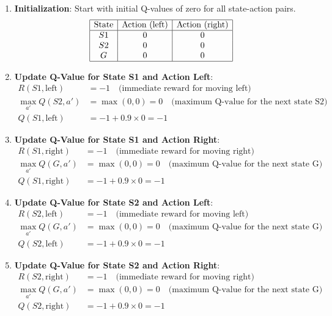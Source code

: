 \documentclass{article}
\begin{document}
\begin{enumerate}
    \item \textbf{Initialization}: Start with initial Q-values of zero for all state-action pairs.
   \[
   \begin{array}{|c|c|c|}
   \hline
   \text{State} & \text{Action (left)} & \text{Action (right)} \\
   \hline
   S1 & 0 & 0 \\
   S2 & 0 & 0 \\
   G & 0 & 0 \\
   \hline
   \end{array}
   \]

    \item \textbf{Update Q-Value for State S1 and Action Left}:
   \begin{align*}
   R(S1, \text{left}) &= -1 \quad \text{(immediate reward for moving left)} \\
   \max_{a'} Q(S2, a') &= \max(0, 0) = 0 \quad \text{(maximum Q-value for the next state S2)} \\
   Q(S1, \text{left}) &= -1 + 0.9 \times 0 = -1
   \end{align*}

    \item \textbf{Update Q-Value for State S1 and Action Right}:
   \begin{align*}
   R(S1, \text{right}) &= -1 \quad \text{(immediate reward for moving right)} \\
   \max_{a'} Q(G, a') &= \max(0, 0) = 0 \quad \text{(maximum Q-value for the next state G)} \\
   Q(S1, \text{right}) &= -1 + 0.9 \times 0 = -1
   \end{align*}

    \item \textbf{Update Q-Value for State S2 and Action Left}:
   \begin{align*}
   R(S2, \text{left}) &= -1 \quad \text{(immediate reward for moving left)} \\
   \max_{a'} Q(G, a') &= \max(0, 0) = 0 \quad \text{(maximum Q-value for the next state G)} \\
   Q(S2, \text{left}) &= -1 + 0.9 \times 0 = -1
   \end{align*}

    \item \textbf{Update Q-Value for State S2 and Action Right}:
   \begin{align*}
   R(S2, \text{right}) &= -1 \quad \text{(immediate reward for moving right)} \\
   \max_{a'} Q(G, a') &= \max(0, 0) = 0 \quad \text{(maximum Q-value for the next state G)} \\
   Q(S2, \text{right}) &= -1 + 0.9 \times 0 = -1
   \end{align*}


\end{enumerate}
\end{document}
